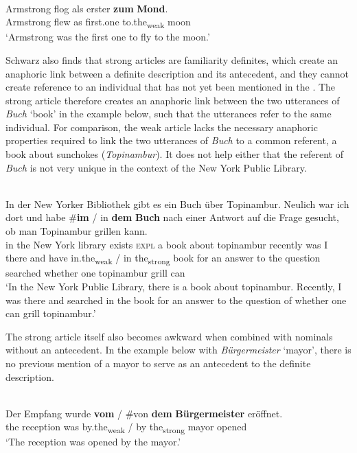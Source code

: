 \documentclass[output=paper,modfonts,nonflat]{langsci/langscibook}
\begin{document}
\ea \label{ex:cisneros:9}
 \\
\gll
Armstrong flog als erster \textbf{zum} \textbf{Mond}.\\
Armstrong flew as first.one to.the\textsubscript{weak} moon\\
\glt
`Armstrong was the first one to fly to the moon.'
\z 

Schwarz also finds that strong articles are familiarity definites, which create an anaphoric link between a definite description and its antecedent, and they cannot create reference to an individual that has not yet been mentioned in the .  The strong article therefore creates an anaphoric link between the two utterances of \textit{Buch} `book' in the example below, such that the utterances refer to the same individual.  For comparison, the weak article lacks the necessary anaphoric properties required to link the two utterances of \textit{Buch} to a common referent, a book about sunchokes (\textit{Topinambur}). It does not help either that the referent of \textit{Buch} is not very unique in the context of the New York Public Library. 

\ea \label{ex:cisneros:10}
 \\
\gll
In der New Yorker Bibliothek gibt es ein Buch \"uber Topinambur.  Neulich war ich dort und habe \textnormal{\#}\textbf{im} \textnormal{/} in \textbf{dem} \textbf{Buch} nach einer Antwort auf die Frage gesucht, ob man Topinambur grillen kann.\\
in the New York library exists \textsc{expl} a book about topinambur recently was I there and have \phantom{\#}in.the\textsubscript{weak} / in the\textsubscript{strong} book for an answer to the question searched whether one topinambur grill can\\
\glt
`In the New York Public Library, there is a book about topinambur.  Recently, I was there and searched in the book for an answer to the question of whether one can grill topinambur.'
\z 

The strong article itself also becomes awkward when combined with nominals without an antecedent.  In the example below with \textit{B\"urgermeister} `mayor', there is no previous mention of a mayor to serve as an antecedent to the definite description.

\ea \label{ex:cisneros:11}
 \\
\gll
Der Empfang wurde \textbf{vom} \textnormal{/} \textnormal{\#}von \textbf{dem} \textbf{B\"urgermeister} er\"offnet.\\
the reception was by.the\textsubscript{weak} / \phantom{\#}by the\textsubscript{strong} mayor opened\\
\glt
`The reception was opened by the mayor.'
\z 
\end{document}

